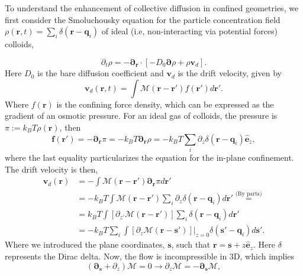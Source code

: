 \documentclass[twoside,openright,titlepage,numbers=noenddot,%
headinclude,footinclude,cleardoublepage=empty,abstract=on,
BCOR=5mm,fontsize=11pt, dvipsnames, paper=b5
]{scrreprt}
\renewcommand{\vec}[1]{\bm{#1}}
\newcommand{\tens}[1]{\bm{\mathcal{#1}}}
\newcommand{\kT}{k_B T}
\newcommand{\ppos}{q}
\newcommand{\fpos}{r}
\newcommand{\fvel}{v}
\begin{document}
To understand the enhancement of collective diffusion in confined geometries, we first consider the Smoluchousky equation for the particle concentration field $\rho(\vec{\fpos}, t) = \sum_i\delta(\vec{\fpos} - \vec{\ppos}_i)$ of ideal (i.e, non-interacting via potential forces) colloids,

\begin{equation}
  \label{eq:smoludensq2D}
  \partial_t \rho = -\vec{\partial}_{\vec{\fpos}}\cdot\left[-D_0\vec{\partial}\rho + \rho\vec{\fvel}_d \right].
\end{equation}
Here $D_0$ is the bare diffusion coefficient and $\vec{\fvel}_d$ is the drift velocity, given by
\begin{equation}
  \vec{\fvel}_d(\vec{\fpos}, t) = \int\tens{M}(\vec{\fpos}-\vec{\fpos}') f(\vec{\fpos}') d\vec{\fpos}'.
\end{equation}
Where $f(\vec{\fpos})$ is the confining force density, which can be expressed as the gradient of an osmotic pressure. For an ideal gas of colloids, the pressure is $\pi := \kT \rho(\vec{\fpos})$, then
\begin{equation}
  \vec{f}(\vec{\fpos}') = -\vec{\partial}_{\vec{\fpos}}\pi = -\kT \vec{\partial}_{\vec{\fpos}}\rho = -\kT \sum_i \partial_z\delta(\vec{\fpos}-\vec{\ppos}_i) \hat{\vec{e}}_z,
\end{equation}
where the last equality particularizes the equation for the in-plane confinement. The drift velocity is then,
\begin{equation}
  \label{eq:driftq2d}
  \begin{aligned}
    \vec{\fvel}_d(\vec{\fpos}) &= -\int\tens{M}(\vec{\fpos}-\vec{\fpos}') \vec{\partial}_{\vec{\fpos}}\pi d\vec{\fpos}' \\
    &=-\kT\int\tens{M}(\vec{\fpos}-\vec{\fpos}') \sum_i \partial_z\delta(\vec{\fpos}-\vec{\ppos}_i) d\vec{\fpos}' \overset{\text{(By parts)}}{=}\\
    &=\kT\int \left[\partial_{z'}\tens{M}(\vec{\fpos}-\vec{\fpos}')\right] \sum_i \delta(\vec{\fpos}-\vec{\ppos}_i) d\vec{\fpos}'\\
    &= -\kT\sum_i\int \left[\partial_z \tens{M}(\vec{\fpos}-\vec{s}')\right]|_{z=0} \delta(\vec{s}' - \vec{\ppos}_i)d\vec{s}'.
  \end{aligned}
\end{equation}
Where we introduced the plane coordinates, $\vec{s}$, such that $\vec{\fpos} = \vec{s} + z\hat{\vec{e}}_z$. Here $\delta$ represents the Dirac delta.
Now, the flow is incompressible in 3D, which implies
\begin{equation}
  \label{eq:q2dtotalflow}
  (\vec{\partial}_{\vec{s}} + \partial_z)\tens{M} = 0 \rightarrow \partial_z\tens{M} = -\vec{\partial}_{\vec{s}}\tens{M},  
\end{equation}
\end{document}
